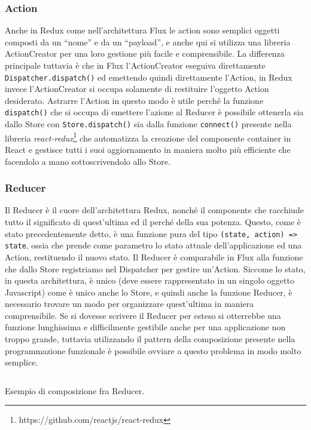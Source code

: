 \subsubsection*{Action}
Anche in Redux come nell'architettura Flux le action sono semplici oggetti composti da un “nome” e da un “payload”, e anche qui si utilizza una libreria ActionCreator per una loro gestione più facile e comprensibile. La differenza principale tuttavia è che in Flux l'ActionCreator eseguiva direttamente \texttt{Dispatcher.dispatch()} ed emettendo quindi direttamente l'Action, in Redux invece l'ActionCreator si occupa solamente di restituire l'oggetto Action desiderato. Astrarre l'Action in questo modo è utile perché la funzione \texttt{dispatch()} che si occupa di emettere l'azione al Reducer è possibile ottenerla sia dallo Store con \texttt{Store.dispatch()} sia dalla funzione \texttt{connect()} presente nella libreria \textit{react-redux}\footnote{https://github.com/reactjs/react-redux} che automatizza la creazione del componente container in React e gestisce tutti i suoi aggiornamento in maniera molto più efficiente che facendolo a mano sottoscrivendolo allo Store.

\subsubsection*{Reducer}
Il Reducer è il cuore dell'architettura Redux, nonché il componente che racchiude tutto il significato di quest'ultima ed il perché della sua potenza. Questo, come è stato precedentemente detto, è una funzione pura del tipo \texttt{(state, action) => state}, ossia che prende come parametro lo stato attuale dell'applicazione ed una Action, restituendo il nuovo stato. Il Reducer è comparabile in Flux alla funzione che dallo Store registriamo nel Dispatcher per gestire un'Action.
Siccome lo stato, in questa architettura, è unico (deve essere rappresentato in un singolo oggetto Javascript) come è unico anche lo Store, e quindi anche la funzione Reducer, è necessario trovare un modo per organizzare quest'ultima in maniera comprensibile. Se si dovesse scrivere il Reducer per esteso si otterrebbe una funzione lunghissima e difficilmente gestibile anche per una applicazione non troppo grande, tuttavia utilizzando il pattern della composizione presente nella programmazione funzionale è possibile ovviare a questo problema in modo molto semplice.

\begin{listing}[ht]
\inputminted{javascript}{sources/exampleReduxReducer.js}
\caption{Esempio di composizione fra Reducer.} 
\label{exampleReduxReducer} 
\end{listing}

